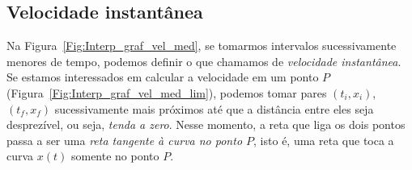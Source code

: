 \subsection{Velocidade instantânea}

Na Figura~\ref{Fig:Interp_graf_vel_med}, se tomarmos intervalos sucessivamente menores de tempo, podemos definir o que chamamos de \emph{velocidade instantânea}. Se estamos interessados em calcular a velocidade em um ponto $P$ (Figura~\ref{Fig:Interp_graf_vel_med_lim}), podemos tomar pares $(t_i, x_i)$, $(t_f, x_f)$ sucessivamente mais próximos até que a distância entre eles seja desprezível, ou seja, \emph{tenda a zero}. Nesse momento, a reta que liga os dois pontos passa a ser uma \emph{reta tangente à curva no ponto $P$}, isto é, uma reta que toca a curva $x(t)$ somente no ponto $P$.

